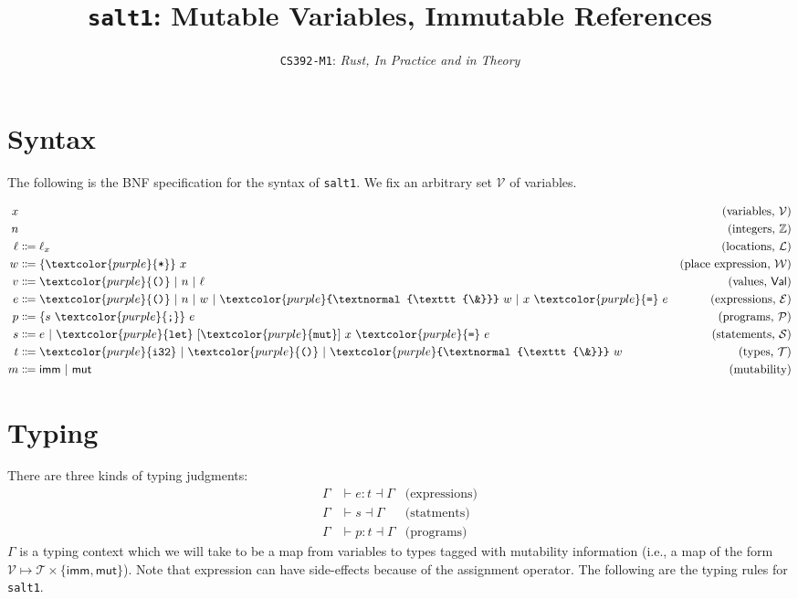 \documentclass[10pt]{article}
\title{\texttt{salt1}: Mutable Variables, Immutable References}
\author{\texttt{CS392-M1}: \textit{Rust, In Practice and in Theory}}
\date{}
\newcommand{\code}[1]{\textcolor{purple}{\textnormal{\texttt{#1}}}}
\newcommand{\bop}[3]{#2 \ #1 \ #3}
\newcommand{\asgn}{\code{=}}
\newcommand{\unitt}{\code{()}}
\newcommand{\intty}{\code{i32}}
\newcommand{\unitty}{\code{()}}
\newcommand{\alt}{\ | \ }
\newcommand{\cceq}{\Coloneqq}
\begin{document}
\maketitle

\section{Syntax}

The following is the BNF specification for the syntax of
\texttt{salt1}.  We fix an arbitrary set $\mathcal V$ of variables.

\begin{align*}
  x & &\text{(variables, $\mathcal V$)} \\
  n & &\text{(integers, $\mathbb Z$)} \\
  \ell &\cceq \ell_x &\text{(locations, $\mathcal L$)} \\
  w &\cceq \{ \code * \} \ x &\text{(place expression, $\mathcal W$)} \\
  v &\cceq \unitt \alt n \alt \ell  &\text{(values, $\mathsf{Val}$)} \\
  e &\cceq \unitt
  \alt n
  \alt w
  \alt \code{\&} \ w  \alt \bop {\asgn} x e &\text{(expressions, $\mathcal E$)} \\
  p &\cceq \{ s \ \code{;} \} \ e &\text{(programs, $\mathcal P$)} \\
  s &\cceq e \alt \code{let} \ [\code{mut}] \ x \ \code{=} \ e &\text{(statements, $\mathcal {S}$)} \\
  t &\cceq \intty \alt \unitty \alt \code{\&} \ w &\text{(types, $\mathcal T$)} \\
  m &\cceq \mathsf{imm} \alt \mathsf{mut} &\text{(mutability)}
\end{align*}

\section{Typing}

There are three kinds of typing judgments:
\begin{align*}
  \Gamma &\vdash e : t \dashv \Gamma &\text{(expressions)} \\
  \Gamma &\vdash s \dashv \Gamma &\text{(statments)} \\
  \Gamma &\vdash p : t \dashv \Gamma &\text{(programs)}
\end{align*}
$\Gamma$ is a typing context which we will take to be a map from
variables to types tagged with mutability information (i.e., a map of
the form $\mathcal V \mapsto \mathcal T \times \{\mathsf{imm},
\mathsf{mut}\}$). Note that expression can have side-effects because
of the assignment operator.  The following are the typing rules for
\texttt{salt1}.
\end{document}
